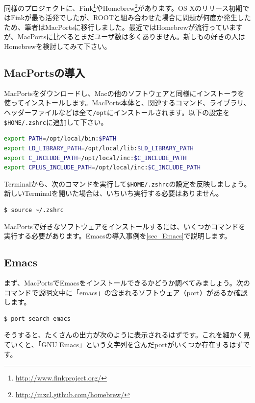 同様のプロジェクトに、Fink\footnote{\url{http://www.finkproject.org/}}やHomebrew\footnote{\url{http://mxcl.github.com/homebrew/}}があります。OS Xのリリース初期ではFinkが最も活発でしたが、ROOTと組み合わせた場合に問題が何度か発生したため、筆者はMacPortsに移行しました。最近ではHomebrewが流行っていますが、MacPortsに比べるとまだユーザ数は多くありません。新しもの好きの人はHomebrewを検討してみて下さい。

\subsection{MacPortsの導入}

MacPortsをダウンロードし、Macの他のソフトウェアと同様にインストーラを使ってインストールします。MacPorts本体と、関連するコマンド、ライブラリ、ヘッダーファイルなどは全て\texttt{/opt}にインストールされます。以下の設定を\texttt{\$HOME/.zshrc}に追加して下さい。
\begin{lstlisting}[language=bash]
export PATH=/opt/local/bin:$PATH
export LD_LIBRARY_PATH=/opt/local/lib:$LD_LIBRARY_PATH
export C_INCLUDE_PATH=/opt/local/inc:$C_INCLUDE_PATH
export CPLUS_INCLUDE_PATH=/opt/local/inc:$C_INCLUDE_PATH
\end{lstlisting}

Terminalから、次のコマンドを実行して\texttt{\$HOME/.zshrc}の設定を反映しましょう。新しいTerminalを開いた場合は、いちいち実行する必要はありません。

\begin{lstlisting}[language=bash]
$ source ~/.zshrc
\end{lstlisting}

MacPortsで好きなソフトウェアをインストールするには、いくつかコマンドを実行する必要があります。Emacsの導入事例を\ref{sec_Emacs}で説明します。

\subsection{Emacs}

まず、MacPortsでEmacsをインストールできるかどうか調べてみましょう。次のコマンドで説明文中に「emacs」の含まれるソフトウェア（port）があるか確認します。

\begin{lstlisting}[language=bash]
$ port search emacs
\end{lstlisting}

そうすると、たくさんの出力が次のように表示されるはずです。これを細かく見ていくと、「GNU Emacs」という文字列を含んだportがいくつか存在するはずです。

